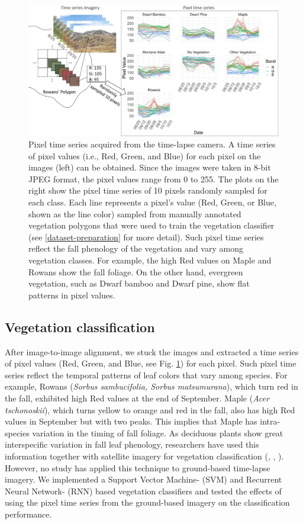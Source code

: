 \documentclass{article}
\begin{document}
\begin{figure}
\includegraphics[width=1\linewidth]{paper_files/figures/Slide1} \caption{Pixel time series acquired from the time-lapse camera. A time series of pixel values (i.e., Red, Green, and Blue) for each pixel on the images (left) can be obtained. Since the images were taken in 8-bit JPEG format, the pixel values range from 0 to 255. The plots on the right show the pixel time series of 10 pixels randomly sampled for each class. Each line represents a pixel's value (Red, Green, or Blue, shown as the line color) sampled from manually annotated vegetation polygons that were used to train the vegetation classifier (see \ref{dataset-preparation} for more detail).  Such pixel time series reflect the fall phenology of the vegetation and vary among vegetation classes. For example, the high Red values on Maple and Rowans show the fall foliage. On the other hand, evergreen vegetation, such as Dwarf bamboo and Dwarf pine, show flat patterns in pixel values.}\label{fig:pixtimeseries}
\end{figure}

\hypertarget{vegetation-classification}{%
\subsection{Vegetation classification}\label{vegetation-classification}}

After image-to-image alignment, we stuck the images and extracted a time series of pixel values (Red, Green, and Blue, see Fig. \ref{fig:pixtimeseries}) for each pixel. Such pixel time series reflect the temporal patterns of leaf colors that vary among species. For example, Rowans (\emph{Sorbus sambucifolia, Sorbus matsumurana}), which turn red in the fall, exhibited high Red values at the end of September. Maple (\emph{Acer tschonoskii}), which turns yellow to orange and red in the fall, also has high Red values in September but with two peaks. This implies that Maple has intra-species variation in the timing of fall foliage. As deciduous plants show great interspecific variation in fall leaf phenology, researchers have used this information together with satellite imagery for vegetation classification (\cite{Son2013RemSen}, \cite{Tigges2013RemSenEnv}, \cite{Heupel2018PFG}). However, no study has applied this technique to ground-based time-lapse imagery. We implemented a Support Vector Machine- (SVM) and Recurrent Neural Network- (RNN) based vegetation classifiers and tested the effects of using the pixel time series from the ground-based imagery on the classification performance.
\end{document}

